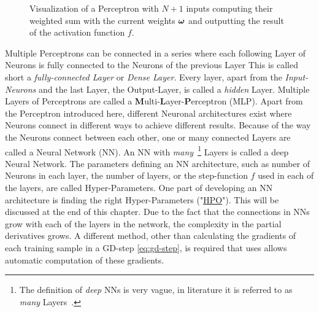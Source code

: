 \begin{figure}[!ht]
    \centering
    \caption{Visualization of a Perceptron with $N+1$ inputs computing their weighted sum with the current weights $\bm{\omega}$ and outputting the result of the activation function $f$.}
    \label{fig:perceptron}
\end{figure}
Multiple Perceptrons can be connected in a series where each following Layer of Neurons is fully connected to the Neurons of the previous Layer
This is called short a \textit{fully-connected Layer} or \textit{Dense Layer}.
Every layer, apart from the \textit{Input-Neurons} and the last Layer, the Output-Layer, is called a \textit{hidden} Layer.
Multiple Layers of Perceptrons are called a \textbf{M}ulti-\textbf{L}ayer-\textbf{P}erceptron (MLP).
Apart from the Perceptron introduced here,  different Neuronal architectures exist where Neurons connect in different ways to achieve different results.
Because of the way the Neurons connect between each other, one or many connected Layers are called a Neural Network (NN).
An NN with \textit{many}~\footnote{The definition of \textit{deep} NNs is very vague, in literature it is referred to as \textit{many} Layers~\cite{handsOn}.} Layers is called a deep Neural Network.
The parameters defining an NN architecture, such as number of Neurons in each layer, the number of layers, or the step-function $f$ used in each of the layers, are called Hyper-Parameters.
One part of developing an NN architecture is finding the right Hyper-Parameters ("\hyperref[subsubsec:hpo]{HPO}").
This will be discussed at the end of this chapter.
Due to the fact that the connections in NNs grow with each of the layers in the network, the complexity in the partial derivatives grows.
A different method, other than calculating the gradients of each training sample in a GD-step \eqref{eq:gd-step}, is required that uses allows automatic computation of these gradients.
